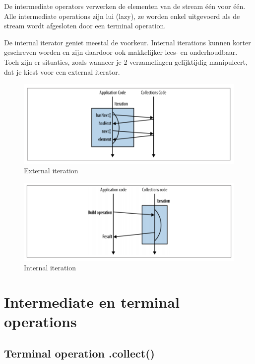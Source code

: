 De intermediate operators verwerken de elementen van de stream \'e\'en voor \'e\'en. Alle intermediate operations zijn lui (lazy), ze worden enkel uitgevoerd als de stream wordt afgesloten door een terminal operation.

De internal iterator geniet meestal de voorkeur. Internal iterations kunnen korter geschreven worden en zijn daardoor ook makkelijker lees- en onderhoudbaar. Toch zijn er situaties, zoals wanneer je 2 verzamelingen gelijktijdig manipuleert, dat je kiest voor een external iterator.

\begin{figure}[H]
  \includegraphics[width=\linewidth]{images/chapter_streams/external_iteration.png}
  \caption{External iteration}
  \label{fig:external_iteration}
\end{figure}

\begin{figure}[H]
  \includegraphics[width=\linewidth]{images/chapter_streams/internal_iteration.png}
  \caption{Internal iteration}
  \label{fig:internal_iteration}
\end{figure}

\section{Intermediate en terminal operations}

\subsection{Terminal operation .collect()}

